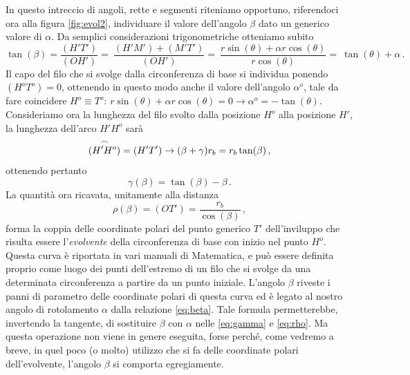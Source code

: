 \noindent In questo intreccio di angoli, rette e segmenti riteniamo opportuno,
riferendoci ora alla figura \ref{fig:evol2},
individuare il valore dell'angolo $\beta$ dato un generico valore di $\alpha$.
Da semplici considerazioni trigonometriche otteniamo subito
\begin{equation}
\tan(\beta) = \frac{(H'T')}{(OH')}=\
\frac{(H'M')+(M'T')}{(OH')}=\
\frac{r\sin(\theta)+\alpha  r\cos(\theta)}{r\cos(\theta)}=\
\tan(\theta) + \alpha\,.
\label{eq:beta}
\end{equation}
\noindent Il capo del filo che si svolge dalla circonferenza di base
si individua ponendo $(H^oT^o)=0$, ottenendo in questo modo anche
il valore dell'angolo $\alpha^o$,
tale da fare coincidere $H^o\equiv T^o$:
$r\sin(\theta)+\alpha  r\cos(\theta) = 0 \rightarrow \alpha^o= -\tan(\theta)$.
Consideriamo ora la lunghezza del filo svolto dalla posizione $H^o$ alla
posizione $H'$, la lunghezza dell'arco $H'H^o$ sar\`a
\begin{equation}
\overset{\large\frown}{(H'H^o)} = (H'T') \rightarrow (\beta + \gamma) r_b= r_b \tan(\beta)\,,
\label{eq:gamma0}
\end{equation}
\noindent ottenendo pertanto
\begin{equation}
 \gamma(\beta) = \tan(\beta)-\beta \,.
\label{eq:gamma}
\end{equation}
\noindent La quantit\`a ora ricavata, unitamente alla distanza
\begin{equation}
\rho(\beta) = (OT') =  \frac{r_b}{\cos(\beta)}\,,
\label{eq:rho}
\end{equation}
\noindent forma la coppia delle coordinate polari del  punto generico
 $T'$ dell'inviluppo
che risulta essere l'{\em evolvente}
 della circonferenza di base con inizio
nel punto $H^o$. Questa curva \`e riportata in vari manuali di Matematica,
e pu\`o essere definita proprio come luogo dei punti dell'estremo di un filo
che si svolge da una determinata circonferenza a partire da un punto iniziale.
L'angolo $\beta$ riveste i panni di
parametro delle
coordinate polari di questa curva ed \`e
legato al nostro angolo di rotolamento
$\alpha$ dalla relazione \ref{eq:beta}. Tale formula permetterebbe,
invertendo la tangente, di sostituire $\beta$ con $\alpha$ nelle
\ref{eq:gamma} e \ref{eq:rho}.
Ma questa operazione
non viene in genere eseguita, forse perch\'e, come vedremo a breve,
in quel poco (o molto) utilizzo che si fa delle coordinate polari dell'evolvente,
l'angolo $\beta$ si comporta egregiamente.

